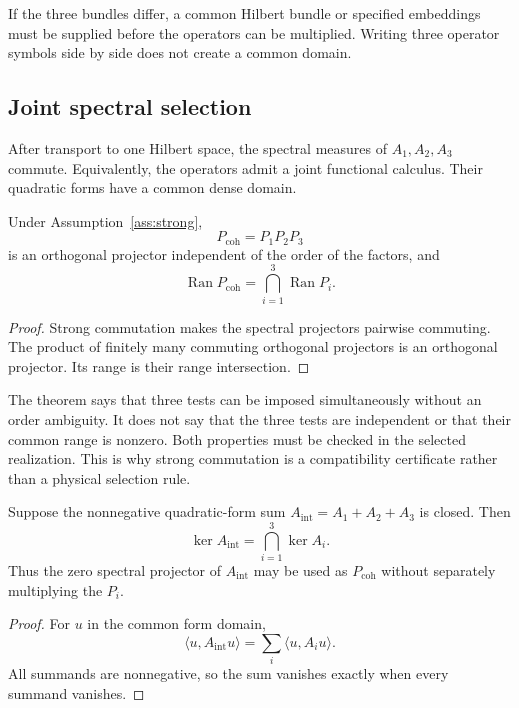 \documentclass[11pt]{article}
\newcommand{\Pcoh}{P_{\mathrm{coh}}}
\begin{document}
If the three bundles differ, a common Hilbert bundle or specified embeddings
must be supplied before the operators can be multiplied.  Writing three
operator symbols side by side does not create a common domain.

\subsection{Joint spectral selection}

\begin{assumption}\label{ass:strong}
After transport to one Hilbert space, the spectral measures of
$A_1,A_2,A_3$ commute.  Equivalently, the operators admit a joint functional
calculus.  Their quadratic forms have a common dense domain.
\end{assumption}

\begin{theorem}\label{thm:joint}
Under Assumption~\ref{ass:strong},
\[
 \Pcoh=P_1P_2P_3
\]
is an orthogonal projector independent of the order of the factors, and
\[
 \operatorname{Ran}\Pcoh
 =
 \bigcap_{i=1}^3\operatorname{Ran}P_i.
\]
\end{theorem}

\begin{proof}
Strong commutation makes the spectral projectors pairwise commuting.
The product of finitely many commuting orthogonal projectors is an orthogonal
projector.  Its range is their range intersection.
\end{proof}

The theorem says that three tests can be imposed simultaneously without an
order ambiguity.  It does not say that the three tests are independent or
that their common range is nonzero.  Both properties must be checked in the
selected realization.  This is why strong commutation is a compatibility
certificate rather than a physical selection rule.

\begin{corollary}\label{cor:sum}
Suppose the nonnegative quadratic-form sum
$A_{\mathrm{int}}=A_1+A_2+A_3$ is closed.  Then
\[
 \ker A_{\mathrm{int}}=\bigcap_{i=1}^3\ker A_i.
\]
Thus the zero spectral projector of $A_{\mathrm{int}}$ may be used as
$\Pcoh$ without separately multiplying the $P_i$.
\end{corollary}

\begin{proof}
For $u$ in the common form domain,
\[
 \langle u,A_{\mathrm{int}}u\rangle
 =
 \sum_i\langle u,A_i u\rangle.
\]
All summands are nonnegative, so the sum vanishes exactly when every summand
vanishes.
\end{proof}
\end{document}
